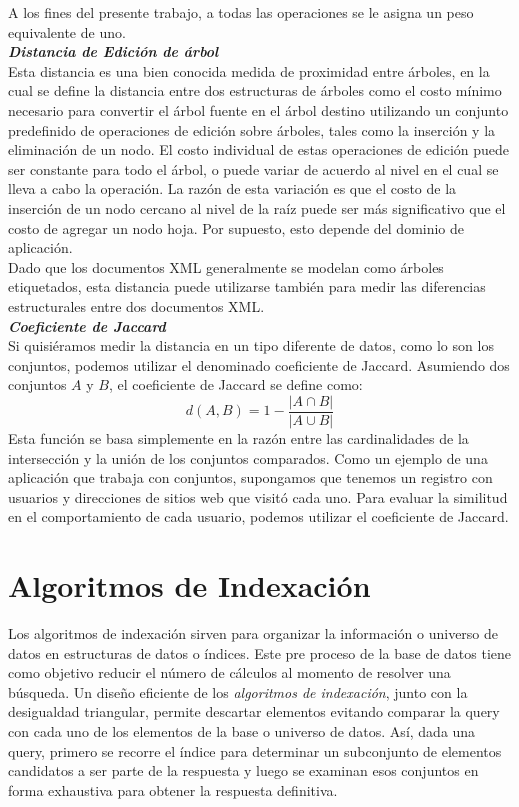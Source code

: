 A los fines del presente trabajo, a todas las operaciones se le asigna un peso equivalente de uno.\\

\noindent \textbf{\textit{Distancia de Edici\'on de \'arbol}}\\

Esta distancia es una bien conocida medida de proximidad entre \'arboles, en la cual se define la distancia entre dos estructuras de \'arboles como el costo m\'inimo necesario para convertir el \'arbol fuente en el \'arbol destino utilizando un conjunto predefinido de operaciones de edici\'on sobre \'arboles, tales como la inserci\'on y la eliminaci\'on de un nodo. El costo individual de estas operaciones de edici\'on puede ser constante para todo el \'arbol, o puede variar de acuerdo al nivel en el cual se lleva a cabo la operaci\'on. La raz\'on de esta variaci\'on es que el costo de la inserci\'on de un nodo cercano al nivel de la ra\'iz puede ser m\'as significativo que el costo de agregar un nodo hoja. Por supuesto, esto depende del dominio de aplicaci\'on.\\

Dado que los documentos XML generalmente se modelan como \'arboles etiquetados, esta distancia puede utilizarse tambi\'en para medir las diferencias estructurales entre dos documentos XML.\\

\noindent \textbf{\textit{Coeficiente de Jaccard}}\\

Si quisi\'eramos medir la distancia en un tipo diferente de datos, como lo son los conjuntos, podemos utilizar el denominado coeficiente de Jaccard. Asumiendo dos conjuntos $A$ y $B$, el coeficiente de Jaccard se define como:
\[
d(A,B) = 1 - \frac{|A \cap B|}{|A\cup B|}
\]
Esta funci\'on se basa simplemente en la raz\'on entre las cardinalidades de la intersecci\'on y la uni\'on de los conjuntos comparados. Como un ejemplo de una aplicaci\'on que trabaja con conjuntos, supongamos que tenemos un registro con usuarios y direcciones de sitios web que visit\'o cada uno. Para evaluar la similitud en el comportamiento de cada usuario, podemos utilizar el coeficiente de Jaccard.\\


\section{Algoritmos de Indexaci\'on}

Los algoritmos de indexaci\'on sirven para organizar la informaci\'on o universo de datos en estructuras de datos o \'indices. Este pre proceso de la base de datos tiene como objetivo reducir el n\'umero de c\'alculos al momento de resolver una b\'usqueda. Un dise\~no eficiente de los \textit{algoritmos de indexaci\'on}, junto con la desigualdad triangular, permite descartar   elementos evitando comparar la query con cada uno de los elementos de la base o universo de datos. As\'i, dada una query, primero se recorre el \'indice para determinar un subconjunto de elementos candidatos a ser parte de la respuesta y luego se examinan esos conjuntos en forma exhaustiva para obtener la respuesta definitiva.\\

